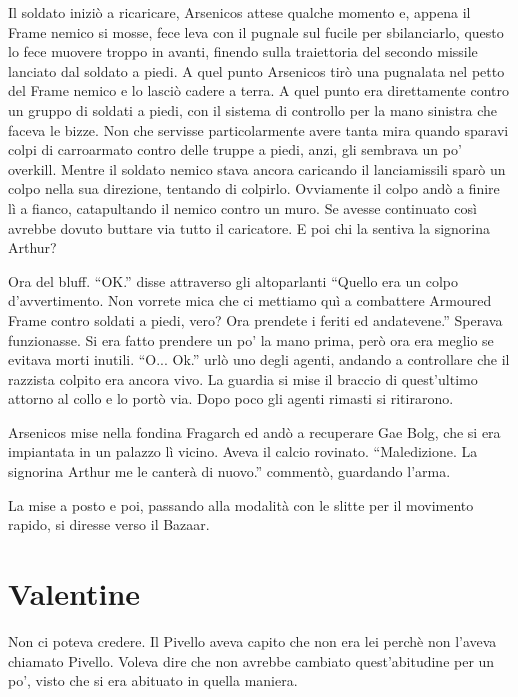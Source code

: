     Il soldato iniziò a ricaricare, Arsenicos attese qualche momento e, appena il Frame nemico si mosse, fece leva con
    il pugnale sul fucile per sbilanciarlo, questo lo fece muovere troppo in avanti, finendo sulla traiettoria del
    secondo missile lanciato dal soldato a piedi. A quel punto Arsenicos tirò una pugnalata nel petto del Frame nemico e
    lo lasciò cadere a terra. A quel punto era direttamente contro un gruppo di soldati a piedi, con il sistema di
    controllo per la mano sinistra che faceva le bizze. Non che servisse particolarmente avere tanta mira quando sparavi
    colpi di carroarmato contro delle truppe a piedi, anzi, gli sembrava un po' overkill. Mentre il soldato nemico stava
    ancora caricando il lanciamissili sparò un colpo nella sua direzione, tentando di colpirlo. Ovviamente il colpo andò
    a finire lì a fianco, catapultando il nemico contro un muro. Se avesse continuato così avrebbe dovuto buttare via
    tutto il caricatore. E poi chi la sentiva la signorina Arthur?

    Ora del bluff. ``OK.'' disse attraverso gli altoparlanti ``Quello era un colpo d'avvertimento. Non vorrete mica che
    ci mettiamo quì a combattere Armoured Frame contro soldati a piedi, vero? Ora prendete i feriti ed andatevene.''
    Sperava funzionasse. Si era fatto prendere un po' la mano prima, però ora era meglio se evitava morti inutili.
    ``O... Ok.'' urlò uno degli agenti, andando a controllare che il razzista colpito era ancora vivo. La guardia si
    mise il braccio di quest'ultimo attorno al collo e lo portò via. Dopo poco gli agenti rimasti si ritirarono.

    Arsenicos mise nella fondina Fragarch ed andò a recuperare Gae Bolg, che si era impiantata in un palazzo lì vicino.
    Aveva il calcio rovinato. ``Maledizione. La signorina Arthur me le canterà di nuovo.'' commentò, guardando l'arma.

    La mise a posto e poi, passando alla modalità con le slitte per il movimento rapido, si diresse verso il Bazaar.

  \section*{Valentine}

    Non ci poteva credere. Il Pivello aveva capito che non era lei perchè non l'aveva chiamato Pivello. Voleva dire che
    non avrebbe cambiato quest'abitudine per un po', visto che si era abituato in quella maniera.

